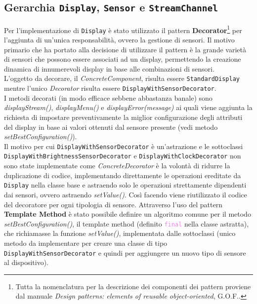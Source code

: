 \documentclass[a4paper,11pt]{article}
\begin{document}
	\subsection{Gerarchia \texttt{Display}, \texttt{Sensor} e \texttt{StreamChannel}}
	Per l'implementazione di \texttt{Display} è stato utilizzato il pattern \textbf{Decorator}\footnote{Tutta la nomenclatura per la descrizione dei componenti dei pattern proviene dal manuale \textit{Design patterns: elements of reusable object-oriented}, {\selectfont G.O.F.}.} per l'aggiunta di un'unica responsabilità, ovvero la gestione di sensori. Il motivo primario che ha portato alla decisione di utilizzare il pattern è la grande varietà di sensori che possono essere associati ad un display, permettendo la creazione dinamica di innumerevoli display in base alle combinazioni di sensori.\\
	L'oggetto da decorare, il \textit{ConcreteComponent}, risulta essere \texttt{StandardDisplay} mentre l'unico \textit{Decorator} risulta essere \texttt{DisplayWithSensorDecorator}.\\
	I metodi decorati (in modo efficace sebbene abbastanza banale) sono \textit{displayStream()}, \textit{displayMenu()} e \textit{displayError(message)} ai quali viene aggiunta la richiesta di impostare preventivamente la miglior configurazione degli attributi del display in base ai valori ottenuti dal sensore presente (vedi metodo \textit{setBestConfiguration()}).\\
	Il motivo per cui \texttt{DisplayWithSensorDecorator} è un'astrazione e le sottoclassi \texttt{DisplayWithBrightnessSensorDecorator} e \texttt{DisplayWithClockDecorator} non sono state implementate come \textit{ConcreteDecorator} è la volontà di ridurre la duplicazione di codice, implementando direttamente le operazioni ereditate da \texttt{Display} nella classe base e astraendo solo le operazioni strettamente dipendenti dai sensori, ovvero astraendo \textit{setValue()}. Così facendo viene riutilizzato il codice del decoratore per ogni tipologia di sensore. Attraverso l'uso del pattern \textbf{Template Method} è stato possibile definire un algoritmo comune per il metodo \textit{setBestConfiguration()}, il template method (definito \textcolor{violet}{\texttt{final}} nella classe astratta), che richiamasse la funzione \textit{setValue()}, implementata dalle sottoclassi (unico metodo da implementare per creare una classe di tipo \texttt{DisplayWithSensorDecorator} e quindi per aggiungere un nuovo tipo di sensore al dispositivo).\\
\end{document}
